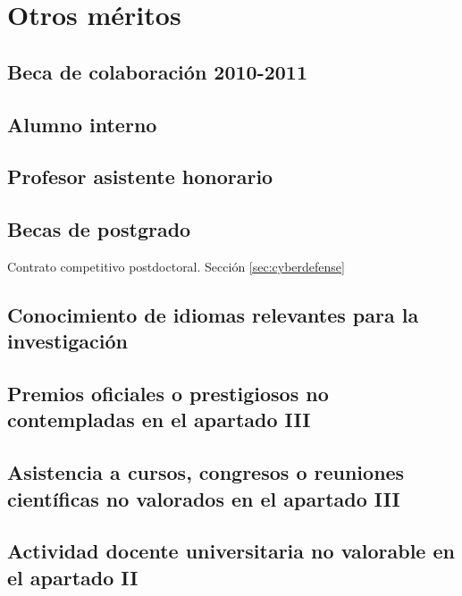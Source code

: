 \section{Otros méritos}

\subsection{Beca de colaboración 2010-2011}

\subsection{Alumno interno}

\subsection{Profesor asistente honorario}

\subsection{Becas de postgrado}
\label{competitivo}
Contrato competitivo postdoctoral. Sección \ref{sec:cyberdefense}
 
\subsection{Conocimiento de idiomas relevantes para la investigación}
\startitems
{} 
\stopitems

\subsection{Premios oficiales o prestigiosos no contempladas en el apartado III}
\label{sec:premiostesis}

\subsection{Asistencia a cursos, congresos o reuniones científicas no valorados en el apartado III}
 
\subsection{Actividad docente universitaria no valorable en el apartado II}
\label{sec:docenciaingles}

